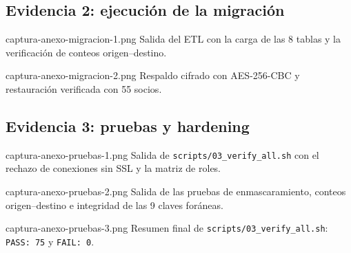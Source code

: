 \subsection{Evidencia 2: ejecución de la migración}

%
  {captura-anexo-migracion-1.png}%
  {Salida del ETL con la carga de las 8 tablas y la verificación de conteos origen--destino.}

%
  {captura-anexo-migracion-2.png}%
  {Respaldo cifrado con AES-256-CBC y restauración verificada con 55 socios.}

\subsection{Evidencia 3: pruebas y hardening}

%
  {captura-anexo-pruebas-1.png}%
  {Salida de \texttt{scripts/03\_verify\_all.sh} con el rechazo de conexiones sin SSL y la matriz de roles.}

%
  {captura-anexo-pruebas-2.png}%
  {Salida de las pruebas de enmascaramiento, conteos origen--destino e integridad de las 9 claves foráneas.}

%
  {captura-anexo-pruebas-3.png}%
  {Resumen final de \texttt{scripts/03\_verify\_all.sh}: \texttt{PASS: 75} y \texttt{FAIL: 0}.}
